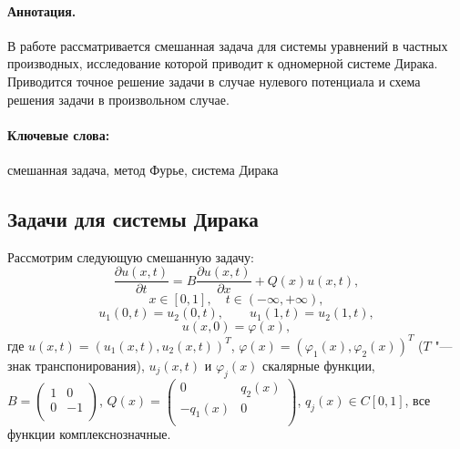 
\vzmscaption



\paragraph{Аннотация.}
В   работе   рассматривается смешанная задача для  системы
уравнений в частных производных, исследование которой приводит к
одномерной системе Дирака.
Приводится точное решение задачи в случае нулевого потенциала и схема решения задачи в произвольном случае.

\paragraph{Ключевые слова:}
смешанная задача, метод Фурье, система Дирака


\subsection{ Задачи для системы Дирака }

Рассмотрим следующую смешанную задачу:
 \begin{equation}\label{JVM18-Burl_eq1}
\frac{\partial u(x,t)}{\partial t}=B\frac{\partial u(x,t)}{\partial
x}+Q(x)u(x,t),
\end{equation}
$$  x\in [0,1], \quad t\in (-\infty ,+\infty),$$
\begin{equation}\label{JVM18-Burl_eq2}
     {{u}_{1}}(0,t)={{u}_{2}}(0,t),   \qquad {{u}_{1}}(1,t)={{u}_{2}}(1,t),
     \end{equation}
\begin{equation}\label{JVM18-Burl_eq3}
     u(x,0)=\varphi (x),
\end{equation}
где  $u(x,t)={{\left( {{u}_{1}}(x,t),{{u}_{2}}(x,t) \right)}^{T}}$,
$\varphi (x)={{({{\varphi }_{1}}(x),{{\varphi }_{2}}(x))}^{T}}$ ($T$
"--- знак транспонирования),  ${{u}_{j}}(x,t)$ и ${{\varphi
}_{j}}(x)$ скалярные функции,\\ $B=\left( \begin{matrix}
   1 & 0  \\
   0 & -1  \\
\end{matrix} \right)$,  $Q(x)=\left( \begin{matrix}
   0 & {{q}_{2}}(x)  \\
   -{{q}_{1}}(x) & 0  \\
\end{matrix} \right)$,  ${{q}_{j}}(x)\in C[0,1]$, все функции  комплекснозначные.

